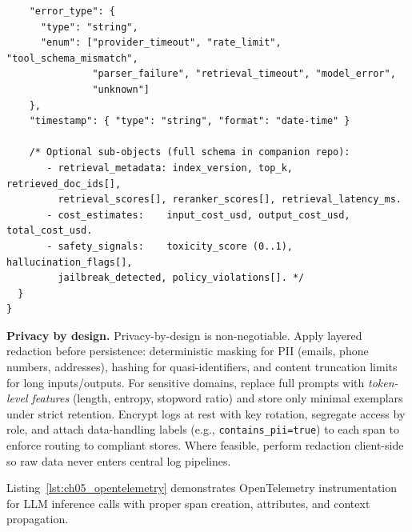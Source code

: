 \begin{codebox}
\begin{verbatim}
    "error_type": {
      "type": "string",
      "enum": ["provider_timeout", "rate_limit", "tool_schema_mismatch",
               "parser_failure", "retrieval_timeout", "model_error",
               "unknown"]
    },
    "timestamp": { "type": "string", "format": "date-time" }

    /* Optional sub-objects (full schema in companion repo):
       - retrieval_metadata: index_version, top_k, retrieved_doc_ids[],
         retrieval_scores[], reranker_scores[], retrieval_latency_ms.
       - cost_estimates:    input_cost_usd, output_cost_usd, total_cost_usd.
       - safety_signals:    toxicity_score (0..1), hallucination_flags[],
         jailbreak_detected, policy_violations[]. */
  }
}
\end{verbatim}
\end{codebox}

\medskip
\noindent\textbf{Privacy by design.}
Privacy-by-design is non-negotiable. Apply layered redaction before persistence: deterministic masking for PII (emails, phone numbers, addresses), hashing for quasi-identifiers, and content truncation limits for long inputs/outputs. For sensitive domains, replace full prompts with \emph{token-level features} (length, entropy, stopword ratio) and store only minimal exemplars under strict retention. Encrypt logs at rest with key rotation, segregate access by role, and attach data-handling labels (e.g., \texttt{contains\_pii=true}) to each span to enforce routing to compliant stores. Where feasible, perform redaction client-side so raw data never enters central log pipelines.

Listing~\ref{lst:ch05_opentelemetry} demonstrates OpenTelemetry instrumentation for LLM inference calls with proper span creation, attributes, and context propagation.

